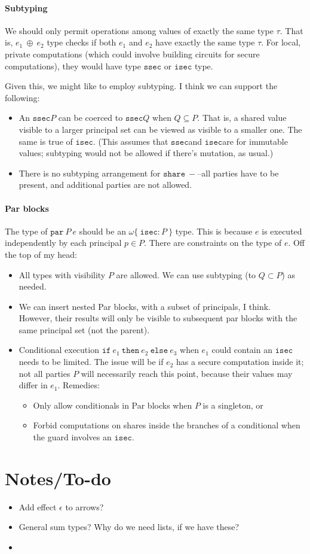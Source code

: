 \documentclass[10pt]{article}
\newcommand{\kw}[1]{\ensuremath{\mathtt{#1}}}
\newcommand{\ssec}{\ensuremath{\mathtt{ssec}}}
\newcommand{\isec}{\ensuremath{\mathtt{isec}}}
\newcommand{\sshare}[1]{\ensuremath{\mathtt{share}~{#1}}}
\newcommand{\sectyp}[3]{\ensuremath{{#1} \{~{#2}:{#3}~\}}}
\newcommand{\ebinop}[2]{\ensuremath{{#1}~\oplus~{#2}}}
\newcommand{\epar}[2]{\ensuremath{\kw{par}~{#1}~{#2}}}
\newcommand{\econd}[3]{\ensuremath{\kw{if}~{#1}~\kw{then}~{#2}~\kw{else}~{#3}}}
\begin{document}
\paragraph*{Subtyping}

We should only permit operations among values of exactly the same type
$\tau$. That is, $\ebinop{e_1}{e_2}$ type checks if both $e_1$ and
$e_2$ have exactly the same type $\tau$. For local, private computations
(which could involve building circuits for secure computations), they
would have type $\ssec$ or $\isec$ type.

 Given this, we might like to employ subtyping. I think we can support the following:
\begin{itemize}
\item An \ssec $P$ can be coerced to \ssec $Q$ when $Q \subseteq
  P$. That is, a shared value visible to a larger principal set can be
  viewed as visible to a smaller one. The same is true of \isec. (This
  assumes that \ssec and \isec are for immutable values; subtyping
  would not be allowed if there's mutation, as usual.)
\item There is no subtyping arrangement for \sshare---all parties have
  to be present, and additional parties are not allowed.
\end{itemize}

\paragraph*{Par blocks}

The type of $\epar{P}{e} $ should be an $\sectyp{\omega}{\isec}{P}$
type. This is because $e$ is executed independently by each principal
$p \in P$. There are constraints on the type of $e$. Off the top of my
head:
\begin{itemize}
\item All types with visibility $P$ are allowed. We can use subtyping
  (to $Q \subset P$) as needed.
  \item We can insert nested Par blocks, with a subset of principals,
    I think. However, their results will only be visible to subsequent
    par blocks with the same principal set (not the parent).
  \item Conditional execution $\econd{e_1}{e_2}{e_3}$ when $e_1$ could
    contain an $\isec$ needs to be limited. The issue will be if $e_2$
    has a secure computation inside it; not all parties $P$ will
    necessarily reach this point, because their values may differ in
    $e_1$. Remedies:
    \begin{itemize}
      \item Only allow conditionals in Par blocks when $P$ is a singleton, or
      \item Forbid computations on shares inside the branches of a
        conditional when the guard involves an \isec.
      \end{itemize}
\end{itemize}

\section{Notes/To-do}

\begin{itemize}
\item Add effect $\epsilon$ to arrows?
\item General sum types? Why do we need lists, if we have these?
\item 
\end{itemize}
\end{document}
